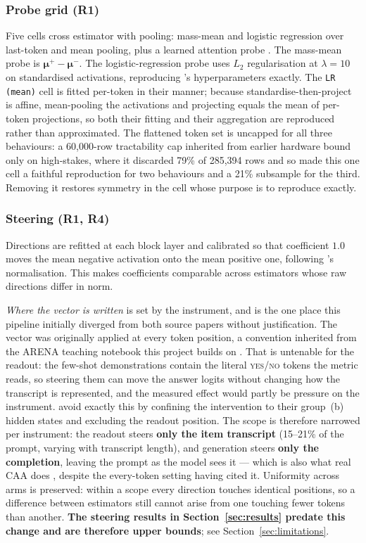 \documentclass[conference]{IEEEtran}
\begin{document}
\subsubsection{Probe grid (R1)}
Five cells cross estimator with pooling: mass-mean and logistic regression over
last-token and mean pooling, plus a learned attention probe
\citep{mckenzie2025,kantamneni2025}. The mass-mean probe is
$\boldsymbol{\mu}^{+}-\boldsymbol{\mu}^{-}$. The logistic-regression probe uses
$L_2$ regularisation at $\lambda=10$ on standardised activations, reproducing
\citeauthor{goldowsky2025}'s hyperparameters exactly. The \texttt{LR (mean)}
cell is fitted per-token in their manner; because standardise-then-project is
affine, mean-pooling the activations and projecting equals the mean of
per-token projections, so both their fitting and their aggregation are
reproduced rather than approximated. The flattened token set is uncapped for all
three behaviours: a 60{,}000-row tractability cap inherited from earlier hardware
bound only on high-stakes, where it discarded 79\% of 285{,}394 rows and so made
this one cell a faithful reproduction for two behaviours and a 21\% subsample for
the third. Removing it restores symmetry in the cell whose purpose is to
reproduce \citeauthor{goldowsky2025} exactly.

\subsubsection{Steering (R1, R4)}
Directions are refitted at each block layer and calibrated so that coefficient
$1.0$ moves the mean negative activation onto the mean positive one, following
\citeauthor{marks2024}'s normalisation. This makes coefficients comparable
across estimators whose raw directions differ in norm.

\emph{Where the vector is written} is set by the instrument, and is the one place
this pipeline initially diverged from both source papers without justification.
The vector was originally applied at every token position, a convention inherited
from the ARENA teaching notebook this project builds on \citep{arena2024}. That is
untenable for the readout: the few-shot demonstrations contain the literal
\textsc{yes}/\textsc{no} tokens the metric reads, so steering them can move the
answer logits without changing how the transcript is represented, and the measured
effect would partly be pressure on the instrument.
\citet{marks2024} avoid exactly this by confining the intervention to their
group~(b) hidden states and excluding the readout position. The scope is therefore
narrowed per instrument: the readout steers \textbf{only the item transcript}
(15--21\% of the prompt, varying with transcript length), and generation steers
\textbf{only the completion}, leaving the prompt as the model sees it --- which is
also what real CAA does \citep{rimsky2024}, despite the every-token setting having
cited it. Uniformity across arms is preserved: within a scope every direction
touches identical positions, so a difference between estimators still cannot arise
from one touching fewer tokens than another. \textbf{The steering results in
Section~\ref{sec:results} predate this change and are therefore upper bounds}; see
Section~\ref{sec:limitations}.
\end{document}
